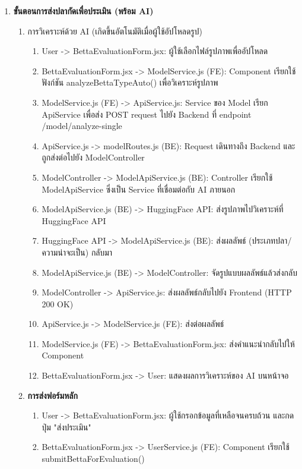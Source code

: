 \begin{sloppypar}
	\begin{enumerate}
		\item \textbf{ขั้นตอนการส่งปลากัดเพื่อประเมิน (พร้อม AI)}
		\begin{enumerate}
			\item การวิเคราะห์ด้วย AI (เกิดขึ้นอัตโนมัติเมื่อผู้ใช้อัปโหลดรูป)
			\begin{enumerate}
				\item User -> BettaEvaluationForm.jsx: ผู้ใช้เลือกไฟล์รูปภาพเพื่ออัปโหลด
				\item BettaEvaluationForm.jsx -> ModelService.js (FE): Component เรียกใช้ฟังก์ชัน analyzeBettaTypeAuto() เพื่อวิเคราะห์รูปภาพ
				\item ModelService.js (FE) -> ApiService.js: Service ของ Model เรียก ApiService เพื่อส่ง POST request ไปยัง Backend ที่ endpoint /model/analyze-single
				\item ApiService.js -> modelRoutes.js (BE): Request เดินทางถึง Backend และถูกส่งต่อไปยัง ModelController
				\item ModelController -> ModelApiService.js (BE): Controller เรียกใช้ ModelApiService ซึ่งเป็น Service ที่เชื่อมต่อกับ AI ภายนอก
				\item ModelApiService.js (BE) -> HuggingFace API: ส่งรูปภาพไปวิเคราะห์ที่ HuggingFace API 
				\item HuggingFace API -> ModelApiService.js (BE): ส่งผลลัพธ์ (ประเภทปลา/ความน่าจะเป็น) กลับมา
				\item ModelApiService.js (BE) -> ModelController: จัดรูปแบบผลลัพธ์แล้วส่งกลับ
				\item ModelController -> ApiService.js: ส่งผลลัพธ์กลับไปยัง Frontend (HTTP 200 OK)
				\item ApiService.js -> ModelService.js (FE): ส่งต่อผลลัพธ์
				\item ModelService.js (FE) -> BettaEvaluationForm.jsx: ส่งคำแนะนำกลับไปให้ Component
				\item BettaEvaluationForm.jsx -> User: แสดงผลการวิเคราะห์ของ AI บนหน้าจอ
			\end{enumerate} 
\newpage
			\item \textbf{การส่งฟอร์มหลัก} 
				\begin{enumerate}
					\item User -> BettaEvaluationForm.jsx: ผู้ใช้กรอกข้อมูลที่เหลือจนครบถ้วน และกดปุ่ม "ส่งประเมิน"
					\item BettaEvaluationForm.jsx -> UserService.js (FE): Component เรียกใช้ submitBettaForEvaluation()

\end{enumerate}
\end{enumerate}
\end{enumerate}
\end{sloppypar}
